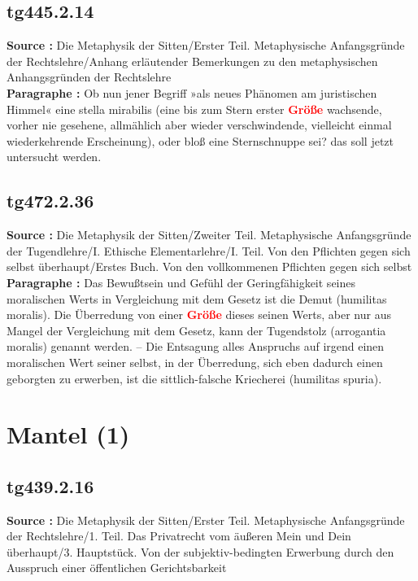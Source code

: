 \documentclass[a4paper,12pt,twoside]{book}
\newcommand{\match}[1]{\textcolor{red}{\textbf{#1}}}
\newcommand{\unnumberedsection}[1]{
	\section*{#1}
	\addcontentsline{toc}{section}{#1}
	\markright{#1}
}
\begin{document}
	\subsection*{tg445.2.14} 
	\textbf{Source : }Die Metaphysik der Sitten/Erster Teil. Metaphysische Anfangsgründe der Rechtslehre/Anhang erläutender Bemerkungen zu den metaphysischen Anhangsgründen der Rechtslehre\\  
	
	\textbf{Paragraphe : }Ob nun jener Begriff »als neues Phänomen am juristischen Himmel« eine stella mirabilis (eine bis zum Stern erster \match{Größe} wachsende, vorher nie gesehene, allmählich aber wieder verschwindende,  vielleicht einmal wiederkehrende Erscheinung), oder bloß eine Sternschnuppe sei? das soll jetzt untersucht werden. 
	
	\subsection*{tg472.2.36} 
	\textbf{Source : }Die Metaphysik der Sitten/Zweiter Teil. Metaphysische Anfangsgründe der Tugendlehre/I. Ethische Elementarlehre/I. Teil. Von den Pflichten gegen sich selbst überhaupt/Erstes Buch. Von den vollkommenen Pflichten gegen sich selbst\\  
	
	\textbf{Paragraphe : }Das Bewußtsein und Gefühl der Geringfähigkeit seines moralischen Werts in Vergleichung mit dem Gesetz
	ist die Demut (humilitas moralis). Die Überredung von einer \match{Größe} dieses seinen Werts, aber nur aus Mangel der Vergleichung mit dem Gesetz, kann der Tugendstolz (arrogantia moralis) genannt werden. – Die Entsagung alles Anspruchs auf irgend einen moralischen Wert seiner selbst, in der Überredung, sich eben dadurch einen geborgten zu erwerben, ist die sittlich-falsche Kriecherei (humilitas spuria). 
	
	\unnumberedsection{Mantel (1)} 
	\subsection*{tg439.2.16} 
	\textbf{Source : }Die Metaphysik der Sitten/Erster Teil. Metaphysische Anfangsgründe der Rechtslehre/1. Teil. Das Privatrecht vom äußeren Mein und Dein überhaupt/3. Hauptstück. Von der subjektiv-bedingten Erwerbung durch den Ausspruch einer öffentlichen Gerichtsbarkeit\\  
	
\end{document}
